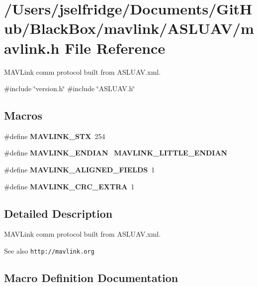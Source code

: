 \section{/\+Users/jselfridge/\+Documents/\+Git\+Hub/\+Black\+Box/mavlink/\+A\+S\+L\+U\+A\+V/mavlink.h File Reference}
\label{_a_s_l_u_a_v_2mavlink_8h}


M\+A\+V\+Link comm protocol built from A\+S\+L\+U\+A\+V.\+xml.  


{\ttfamily \#include \char`\"{}version.\+h\char`\"{}}\newline
{\ttfamily \#include \char`\"{}A\+S\+L\+U\+A\+V.\+h\char`\"{}}\newline
\subsection*{Macros}
\begin{DoxyCompactItemize}
\item 
\#define \textbf{ M\+A\+V\+L\+I\+N\+K\+\_\+\+S\+TX}~254
\item 
\#define \textbf{ M\+A\+V\+L\+I\+N\+K\+\_\+\+E\+N\+D\+I\+AN}~\textbf{ M\+A\+V\+L\+I\+N\+K\+\_\+\+L\+I\+T\+T\+L\+E\+\_\+\+E\+N\+D\+I\+AN}
\item 
\#define \textbf{ M\+A\+V\+L\+I\+N\+K\+\_\+\+A\+L\+I\+G\+N\+E\+D\+\_\+\+F\+I\+E\+L\+DS}~1
\item 
\#define \textbf{ M\+A\+V\+L\+I\+N\+K\+\_\+\+C\+R\+C\+\_\+\+E\+X\+T\+RA}~1
\end{DoxyCompactItemize}


\subsection{Detailed Description}
M\+A\+V\+Link comm protocol built from A\+S\+L\+U\+A\+V.\+xml. 

\begin{DoxySeeAlso}{See also}
{\tt http\+://mavlink.\+org} 
\end{DoxySeeAlso}


\subsection{Macro Definition Documentation}
\mbox{\label{_a_s_l_u_a_v_2mavlink_8h_a66ac6e7995651b5a5cb317194c1f46e0}} 
